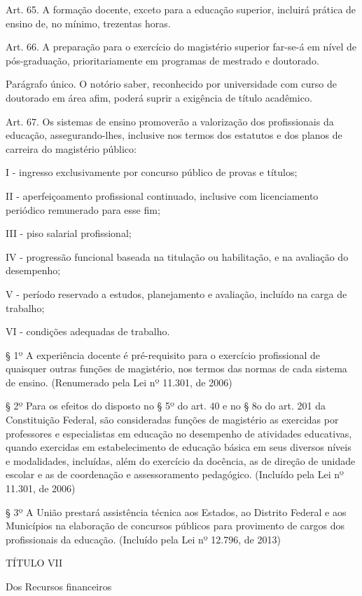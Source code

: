 \documentclass[
]{book}
\begin{document}
Art. 65. A formação docente, exceto para a educação superior, incluirá prática de ensino de, no mínimo, trezentas horas.

Art. 66. A preparação para o exercício do magistério superior far-se-á em nível de pós-graduação, prioritariamente em programas de mestrado e doutorado.

Parágrafo único. O notório saber, reconhecido por universidade com curso de doutorado em área afim, poderá suprir a exigência de título acadêmico.

Art. 67. Os sistemas de ensino promoverão a valorização dos profissionais da educação, assegurando-lhes, inclusive nos termos dos estatutos e dos planos de carreira do magistério público:

I - ingresso exclusivamente por concurso público de provas e títulos;

II - aperfeiçoamento profissional continuado, inclusive com licenciamento periódico remunerado para esse fim;

III - piso salarial profissional;

IV - progressão funcional baseada na titulação ou habilitação, e na avaliação do desempenho;

V - período reservado a estudos, planejamento e avaliação, incluído na carga de trabalho;

VI - condições adequadas de trabalho.

§ 1º A experiência docente é pré-requisito para o exercício profissional de quaisquer outras funções de magistério, nos termos das normas de cada sistema de ensino. (Renumerado pela Lei nº 11.301, de 2006)

§ 2º Para os efeitos do disposto no § 5º do art. 40 e no § 8o do art. 201 da Constituição Federal, são consideradas funções de magistério as exercidas por professores e especialistas em educação no desempenho de atividades educativas, quando exercidas em estabelecimento de educação básica em seus diversos níveis e modalidades, incluídas, além do exercício da docência, as de direção de unidade escolar e as de coordenação e assessoramento pedagógico. (Incluído pela Lei nº 11.301, de 2006)

§ 3º A União prestará assistência técnica aos Estados, ao Distrito Federal e aos Municípios na elaboração de concursos públicos para provimento de cargos dos profissionais da educação. (Incluído pela Lei nº 12.796, de 2013)

TÍTULO VII

Dos Recursos financeiros
\end{document}
